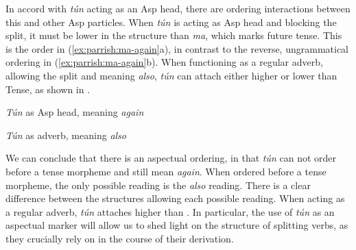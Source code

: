 \documentclass[output=paper]{LSP/langsci}
\begin{document}
 
In accord with \textit{t\'{u}n} acting as an Asp head, there are ordering interactions between this and other Asp particles. When \textit{t\'{u}n} is acting as Asp head and blocking the split, it must be lower in the structure than \textit{ma}, which marks future tense. This is the order in (\ref{ex:parrish:ma-again}a), in contrast to the reverse, ungrammatical ordering in (\ref{ex:parrish:ma-again}b). When functioning as a regular adverb, allowing the split and meaning \textit{also}, \textit{t\'{u}n} can attach either higher or lower than Tense, as shown in . 
   

\ea  \label{ex:parrish:ma-again}  \textit{T\'{u}n} as Asp head, meaning \textit{again}
    
 \z

\z



\ea \textit{T\'{u}n} as adverb, meaning \textit{also}
    
 \z
 \label{ex:parrish:ma-also} 
\z


We can conclude that there is an aspectual ordering, in that \textit{t\'{u}n} can not order before a tense morpheme and still mean \textit{again}. When ordered before a tense morpheme, the only possible reading is the \textit{also} reading. There is a clear difference between the structures allowing each possible reading. When acting as a regular adverb, \textit{t\'{u}n} attaches higher than . In particular, the use of \textit{t\'{u}n} as an aspectual marker will allow us to shed light on the structure of splitting verbs, as they crucially rely on  in the course of their derivation.
\end{document}
